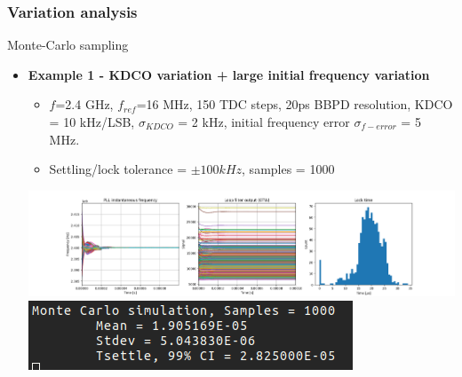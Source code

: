 \documentclass[t, screen, aspectratio=43]{beamer}
\begin{document}
\begin{frame}
	\frametitle{Variation analysis}
	\begin{block}{Monte-Carlo sampling }
		\begin{itemize}
		\scriptsize
		\item \textbf{Example 1 - KDCO variation + large initial frequency variation }
		\begin{itemize}
			\scriptsize
			\item $f$=2.4 GHz, $f_{ref}$=16 MHz, 150 TDC steps, 20ps BBPD resolution, KDCO = 10 kHz/LSB, $\sigma_{KDCO}$ = 2 kHz, initial frequency error $\sigma_{f-error}$ = 5 MHz.
			\item Settling/lock tolerance = $\pm 100 kHz$, samples = 1000
		\end{itemize}
		\center\includegraphics[width=1.0\linewidth]{kdco_f_init_mc_hist.png}
		\center\includegraphics[width=0.4\linewidth]{mc_large_df.png}

		\end{itemize}    
	\end{block}
\end{frame}
\end{document}
